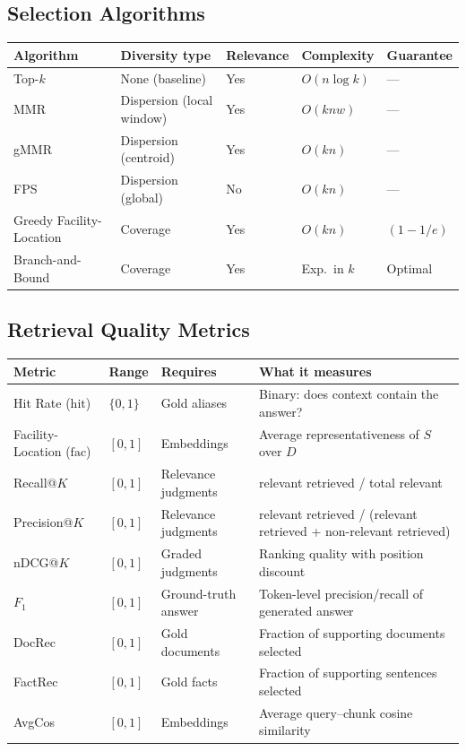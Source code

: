\documentclass[11pt,a4paper]{article}
\begin{document}
\subsection*{Selection Algorithms}

\begin{tabularx}{\textwidth}{@{}X l l l l@{}}
	\toprule
	\textbf{Algorithm} & \textbf{Diversity type}   & \textbf{Relevance} & \textbf{Complexity} & \textbf{Guarantee} \\
	\midrule
	Top-$k$ & None (baseline) & Yes & $O(n \log k)$ & — \\
	MMR & Dispersion (local window) & Yes & $O(k n w)$ & — \\
	gMMR & Dispersion (centroid) & Yes & $O(kn)$ & — \\
	FPS & Dispersion (global) & No & $O(kn)$ & — \\
	Greedy Facility-Location & Coverage & Yes & $O(kn)$ & $(1-1/e)$ \\
	Branch-and-Bound & Coverage & Yes & Exp.\ in $k$ & Optimal \\
	\bottomrule
\end{tabularx}

\subsection*{Retrieval Quality Metrics}

\begin{tabularx}{\textwidth}{@{}l l l X@{}}
	\toprule
	\textbf{Metric} & \textbf{Range} & \textbf{Requires}   & \textbf{What it measures} \\
	\midrule
	Hit Rate ($\mathrm{hit}$) & $\{0,1\}$ & Gold aliases & Binary: does context contain the answer? \\
	Facility-Location ($\mathrm{fac}$) & $[0,1]$ & Embeddings & Average representativeness of $S$ over $D$ \\
	Recall@$K$ & $[0,1]$ & Relevance judgments & relevant retrieved / total relevant \\
	Precision@$K$ & $[0,1]$ & Relevance judgments & relevant retrieved / (relevant retrieved + non-relevant retrieved) \\
	nDCG@$K$ & $[0,1]$ & Graded judgments    & Ranking quality with position discount \\
	$F_1$ & $[0,1]$ & Ground-truth answer & Token-level precision/recall of generated answer \\
	DocRec & $[0,1]$ & Gold documents & Fraction of supporting documents selected \\
	FactRec & $[0,1]$ & Gold facts & Fraction of supporting sentences selected \\
	AvgCos & $[0,1]$ & Embeddings & Average query–chunk cosine similarity \\
	\bottomrule
\end{tabularx}
\end{document}
